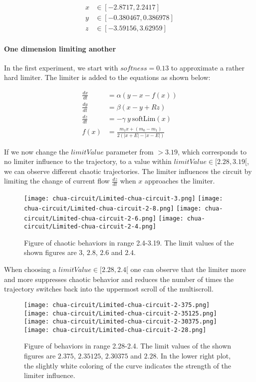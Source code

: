\documentclass[main]{subfiles}
\begin{document}
\begin{align*}
x &\in [-2.8717,2.2417]\\
y &\in [-0.380467,0.386978]\\
z &\in [-3.59156,3.62959]
\end{align*}

\paragraph{One dimension limiting another}

In the first experiment, we start with \(softness=0.13\) to approximate a rather hard limiter. The limiter is added to the equations as shown below:

\begin{align*}
\frac{dx}{dt}&=\alpha (y-x-f(x)) \\
\frac{dy}{dt}&=\beta (x-y + Rz)\\
\frac{dz}{dt}&=-\gamma ~ y ~ \text{softLim}(x)\\
f (x) &= \frac{m_1 x + (m_0 - m_1)}{2 (| x + E | -| x - E |)}
\end{align*}

If we now change the $limitValue$ parameter from \(>3.19\), which corresponds to no limiter influence to the trajectory, to a value within \(limitValue \in [2.28,3.19[\), we can observe different chaotic trajectories. The limiter influences the circuit by limiting the change of current flow \(\frac{dz}{dt}\) when \(x\) approaches the limiter.

\begin{figure}[H]
\centering
\texttt{[image: chua-circuit/Limited-chua-circuit-3.png]}
\texttt{[image: chua-circuit/Limited-chua-circuit-2-8.png]}
\texttt{[image: chua-circuit/Limited-chua-circuit-2-6.png]}
\texttt{[image: chua-circuit/Limited-chua-circuit-2-4.png]}
\caption[Figure of chaotic behaviors in range 2.4-3.19]{Figure of chaotic behaviors in range 2.4-3.19. The limit values of the shown figures are \(3\), \(2.8\), \(2.6\) and \(2.4\).}
\label{figure:chaotictrajectories}
\end{figure}

When choosing a \(limitValue \in [2.28,2.4[\) one can observe that the limiter more and more suppresses chaotic behavior and reduces the number of times the trajectory switches back into the uppermost scroll of the multiscroll.

\begin{figure}[H]
\centering
\texttt{[image: chua-circuit/Limited-chua-circuit-2-375.png]}
\texttt{[image: chua-circuit/Limited-chua-circuit-2-35125.png]}
\texttt{[image: chua-circuit/Limited-chua-circuit-2-30375.png]}
\texttt{[image: chua-circuit/Limited-chua-circuit-2-28.png]}
\caption[Figure of behaviors in range 2.28-2.4]{Figure of behaviors in range 2.28-2.4. The limit values of the shown figures are \(2.375\), \(2.35125\), \(2.30375\) and \(2.28\). In the lower right plot, the slightly white coloring of the curve indicates the strength of the limiter influence.}
\label{figure:chaotictrajectories}
\end{figure}
\end{document}
